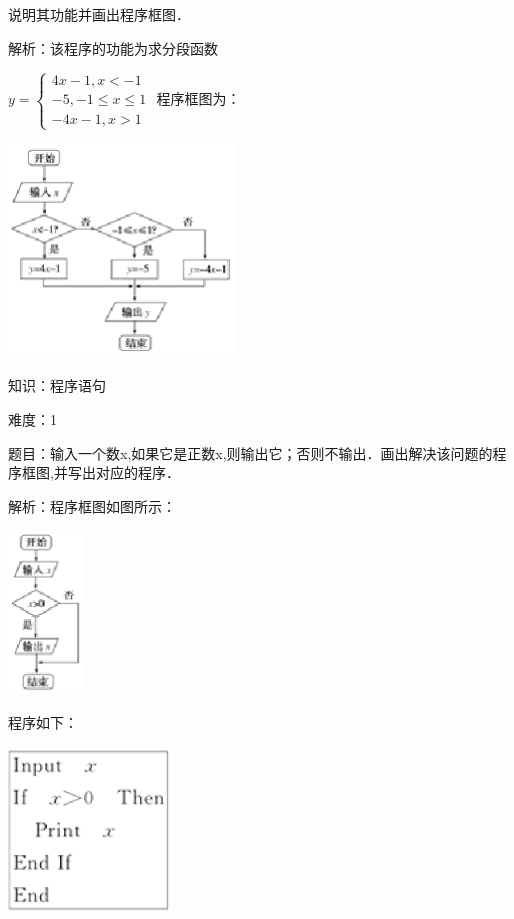 \documentclass{article} %
\begin{document}
说明其功能并画出程序框图．

解析：该程序的功能为求分段函数


$y=\left\{
\begin{array}{l}
4x-1,x<-1\\
-5,-1\leq x \leq 1\\
-4x-1,x>1
\end{array}
\right.$
程序框图为：

\includegraphics*[width=2.36in, height=2.23in, keepaspectratio=false]{image52}

知识：程序语句

难度：1

题目：输入一个数x,如果它是正数x,则输出它；否则不输出．画出解决该问题的程序框图,并写出对应的程序．

解析：程序框图如图所示：

\includegraphics*[width=0.79in, height=1.71in, keepaspectratio=false]{image53}

程序如下：

\includegraphics*[width=1.71in, height=1.73in, keepaspectratio=false]{image54}
\end{document}
